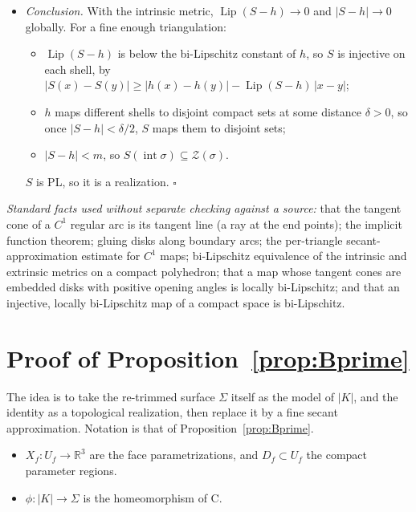 \documentclass[preprint,12pt]{elsarticle}
\theoremstyle{definition}
\theoremstyle{remark}
\newcommand{\R}{\mathbb{R}}
\newcommand{\Z}{\mathcal{Z}}
\newcommand{\inter}{\operatorname{int}}
\begin{document}
\begin{itemize}
\begin{itemize}
  So $\operatorname{Lip}(S-h)\le C\,\omega(\phi',\mathrm{mesh})\to0$.
  \end{itemize}
  This uses only that $\phi$ is $C^1$ on each link segment; no curvature of $\lambda_v$ is needed.
\item \emph{Conclusion.} With the intrinsic metric, $\operatorname{Lip}(S-h)\to0$ and $|S-h|\to0$ globally. For a fine
enough triangulation:
  \begin{itemize}
  \item $\operatorname{Lip}(S-h)$ is below the bi-Lipschitz constant of $h$, so $S$ is injective on each shell, by
  $|S(x)-S(y)|\ge|h(x)-h(y)|-\operatorname{Lip}(S-h)\,|x-y|$;
  \item $h$ maps different shells to disjoint compact sets at some distance $\delta>0$, so once $|S-h|<\delta/2$,
  $S$ maps them to disjoint sets;
  \item $|S-h|<m$, so $S(\inter\sigma)\subseteq\Z(\sigma)$.
  \end{itemize}
  $S$ is PL, so it is a realization. $\square$
\end{itemize}

\emph{Standard facts used without separate checking against a source:} that the tangent cone of a $C^1$ regular arc
is its tangent line (a ray at the end points); the implicit function theorem; gluing disks along boundary arcs; the per-triangle
secant-approximation estimate for $C^1$ maps; bi-Lipschitz equivalence of the intrinsic and extrinsic metrics on a
compact polyhedron; that a map whose tangent cones are embedded disks with positive opening angles is locally
bi-Lipschitz; and that an injective, locally bi-Lipschitz map of a compact space is bi-Lipschitz.

\section{Proof of Proposition~\ref{prop:Bprime}}\label{sec:proofBprime}

The idea is to take the re-trimmed surface $\Sigma$ itself as the model of $|K|$, and the identity as a topological
realization, then replace it by a fine secant approximation. Notation is that of Proposition~\ref{prop:Bprime}.
\begin{itemize}
\item $X_f\colon U_f\to\R^3$ are the face parametrizations, and $D_f\subset U_f$ the compact parameter regions.
\item $\phi\colon|K|\to\Sigma$ is the homeomorphism of C.
\end{itemize}
\end{document}
